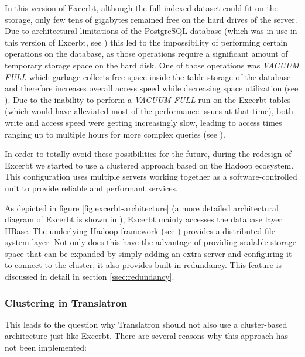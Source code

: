\documentclass[a4paper, 12pt, twoside, reqn]{report}
\numberwithin{figure}{chapter}
\newtheorem[L]{boxedDefinition}{Definition}
\newtheorem[L]{boxedExample}{Example}
\begin{document}
In this version of Excerbt, although the full indexed dataset could fit on the storage, only few tens of gigabytes remained free on the hard drives of the server. Due to architectural limitations of the PostgreSQL database (which was in use in this version of Excerbt, see \cite[section 4.5]{wachinger2013next}) this led to the impossibility of performing certain operations on the database, as those operations require a significant amount of temporary storage space on the hard disk. One of those operations was \textit{VACUUM FULL} which garbage-collects free space inside the table storage of the database and therefore increases overall access speed while decreasing space utilization (see \cite{postgresvacuum}). Due to the inability to perform a \textit{VACUUM FULL} run on the Excerbt tables (which would have alleviated most of the performance issues at that time), both write and access speed were getting increasingly slow, leading to access times ranging up to multiple hours for more complex queries (see \cite[section 4]{wachinger2013next}).

In order to totally avoid these possibilities for the future, during the redesign of Excerbt we started to use a clustered approach based on the Hadoop ecosystem. This configuration uses multiple servers working together as a software-controlled unit to provide reliable and performant services.


As depicted in figure \ref{fig:excerbt-architecture} (a more detailed architectural diagram of Excerbt is shown in \cite[figure 2.9]{wachinger2013next}), Excerbt mainly accesses the database layer HBase. The underlying Hadoop framework (see \cite{taylor2010overview}) provides a distributed file system layer. Not only does this have the advantage of providing scalable storage space that can be expanded by simply adding an extra server and configuring it to connect to the cluster, it also provides built-in redundancy. This feature is discussed in detail in section \ref{ssec:redundancy}.

\afterpage{\clearpage}


\subsubsection{Clustering in Translatron}\label{sssec:clustering-translatron}

This leads to the question why Translatron should not also use a cluster-based architecture just like Excerbt. There are several reasons why this approach has not been implemented:
\end{document}
